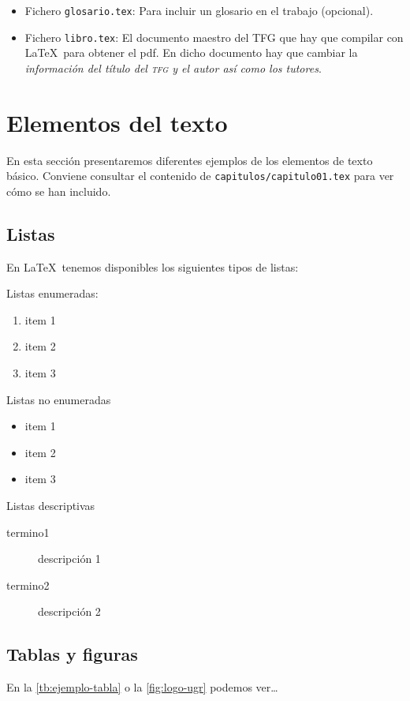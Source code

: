 \begin{itemize}
  \item Fichero \texttt{glosario.tex}: Para incluir un glosario en el trabajo (opcional). 

   \item Fichero \texttt{libro.tex}: El documento maestro del TFG que hay que compilar con \LaTeX\ para obtener el pdf. En dicho documento hay que cambiar la \emph{información del título del \textsc{tfg} y el autor así como los tutores}.
\end{itemize}


\section{Elementos del texto}

En esta sección presentaremos diferentes ejemplos de los elementos de texto básico. Conviene consultar el contenido de \texttt{capitulos/capitulo01.tex} para ver cómo se han incluido.

\subsection{Listas}
En \LaTeX\ tenemos disponibles los siguientes tipos de listas:

Listas enumeradas:
\begin{enumerate}
  \item item 1
  \item item 2
  \item item 3
\end{enumerate}

Listas no enumeradas
\begin{itemize}
  \item item 1
  \item item 2
  \item item 3
  \end{itemize}

Listas descriptivas
\begin{description}
  \item[termino1] descripción 1
  \item[termino2] descripción 2
\end{description}
  
\subsection{Tablas y figuras}

En la \autoref{tb:ejemplo-tabla} o la \autoref{fig:logo-ugr} podemos ver\ldots

